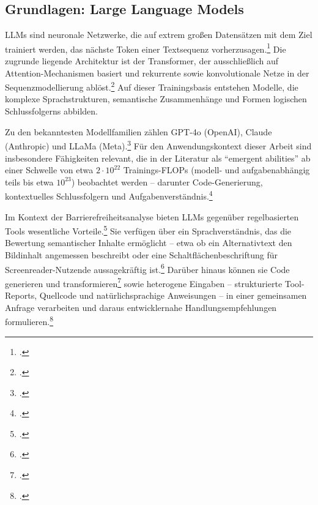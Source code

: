 \subsection{Grundlagen: Large Language Models}

\ac{LLM}s sind neuronale Netzwerke, die auf extrem großen Datensätzen mit dem Ziel trainiert werden, das nächste Token einer Textsequenz vorherzusagen.\footcites[Vgl.][S. 5--6]{brynjolfssonGenerativeAIWork2025}[][S. 146--148]{jurafskyMartinSpeechLanguageProcessing2026} Die zugrunde liegende Architektur ist der Transformer, der ausschließlich auf Attention-Mechanismen basiert und rekurrente sowie konvolutionale Netze in der Sequenzmodellierung ablöst.\footcites[Vgl.][S. 173--174]{jurafskyMartinSpeechLanguageProcessing2026}[][]{vaswani2023attentionneed} Auf dieser Trainingsbasis entstehen Modelle, die komplexe Sprachstrukturen, semantische Zusammenhänge und Formen logischen Schlussfolgerns abbilden.

Zu den bekanntesten Modellfamilien zählen GPT-4o (OpenAI), Claude (Anthropic) und \mbox{LLaMa} (Meta).\footcite[Vgl.][]{anthropic2026claude, openai2023gpt4, touvron2023llama2} Für den Anwendungskontext dieser Arbeit sind insbesondere Fähigkeiten relevant, die in der Literatur als \enquote{emergent abilities} ab einer Schwelle von etwa $2 \cdot 10^{22}$ Trainings-FLOPs (modell- und aufgabenabhängig teils bis etwa $10^{23}$) beobachtet werden -- darunter Code-Generierung, kontextuelles Schlussfolgern und Aufgabenverständnis.\footcite[Vgl.][S. 2]{wei2022emergent}

Im Kontext der Barrierefreiheitsanalyse bieten \ac{LLM}s gegenüber regelbasierten Tools wesentliche Vorteile.\footcite[Vgl.][]{fathallah_accessguru_2025} Sie verfügen über ein Sprachverständnis, das die Bewertung semantischer Inhalte ermöglicht -- etwa ob ein Alternativtext den Bildinhalt angemessen beschreibt oder eine Schaltflächenbeschriftung für Screenreader-Nutzende aussagekräftig ist.\footcite[Vgl.][]{tafreshipour_ma11y_2024} Darüber hinaus können sie Code generieren und transformieren\footcite[Vgl.][S. 3]{touvron2023llama2} sowie heterogene Eingaben -- strukturierte Tool-Reports, Quellcode und natürlichsprachige Anweisungen -- in einer gemeinsamen Anfrage verarbeiten und daraus entwicklernahe Handlungsempfehlungen formulieren.\footcite[Vgl.][S. 298]{bassi_assessment_2025}

